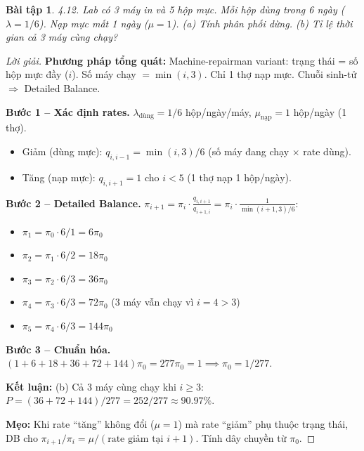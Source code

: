 \documentclass[8pt,a4paper]{article}
\newtheorem{exercise}{Bài tập}
\newenvironment{solution}{\begin{proof}[Lời giải]}{\end{proof}}
\begin{document}
\begin{exercise}
4.12. Lab có 3 máy in và 5 hộp mực. Mỗi hộp dùng trong 6 ngày ($\lambda = 1/6$). Nạp mực mất 1 ngày ($\mu = 1$). 
(a) Tính phân phối dừng. (b) Tỉ lệ thời gian cả 3 máy cùng chạy?
\end{exercise}
\begin{solution}
\textbf{Phương pháp tổng quát:} Machine-repairman variant: trạng thái = số hộp mực đầy ($i$). Số máy chạy $= \min(i, 3)$. Chỉ 1 thợ nạp mực. Chuỗi sinh-tử $\Rightarrow$ Detailed Balance.

\textbf{Bước 1 -- Xác định rates.} $\lambda_{\text{dùng}} = 1/6$ hộp/ngày/máy, $\mu_{\text{nạp}} = 1$ hộp/ngày (1 thợ).
\begin{itemize}[nosep]
\item Giảm (dùng mực): $q_{i,i-1} = \min(i, 3)/6$ \quad (số máy đang chạy $\times$ rate dùng).
\item Tăng (nạp mực): $q_{i,i+1} = 1$ cho $i < 5$ \quad (1 thợ nạp 1 hộp/ngày).
\end{itemize}

\textbf{Bước 2 -- Detailed Balance.} $\pi_{i+1} = \pi_i \cdot \frac{q_{i,i+1}}{q_{i+1,i}} = \pi_i \cdot \frac{1}{\min(i+1,3)/6}$:
\begin{itemize}[nosep]
\item $\pi_1 = \pi_0 \cdot 6/1 = 6\pi_0$
\item $\pi_2 = \pi_1 \cdot 6/2 = 18\pi_0$
\item $\pi_3 = \pi_2 \cdot 6/3 = 36\pi_0$
\item $\pi_4 = \pi_3 \cdot 6/3 = 72\pi_0$ \quad (3 máy vẫn chạy vì $i=4 > 3$)
\item $\pi_5 = \pi_4 \cdot 6/3 = 144\pi_0$
\end{itemize}

\textbf{Bước 3 -- Chuẩn hóa.} $(1+6+18+36+72+144)\pi_0 = 277\pi_0 = 1 \implies \pi_0 = 1/277$.

\textbf{Kết luận:} (b) Cả 3 máy cùng chạy khi $i \ge 3$: $P = (36+72+144)/277 = \boxed{252/277 \approx 90.97\%}$.

\textbf{Mẹo:} Khi rate ``tăng'' không đổi ($\mu = 1$) mà rate ``giảm'' phụ thuộc trạng thái, DB cho $\pi_{i+1}/\pi_i = \mu/(\text{rate giảm tại } i+1)$. Tính dây chuyền từ $\pi_0$.
\end{solution}
\end{document}
